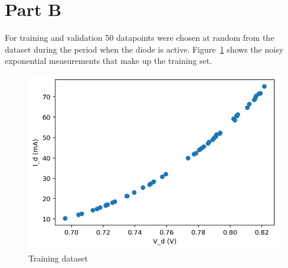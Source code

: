 \newpage
\section{Part B}
\label{sec:sec_b}
For training and validation 50 datapoints were chosen at random from the dataset during the period when the diode is active. Figure~\ref{fig:training} shows the noisy exponential measurements that make up the training set.

\begin{figure}[!htpb]
	\centering
	\includegraphics{figures/training.png}
	\caption{Training dataset}
	\label{fig:training}
\end{figure}